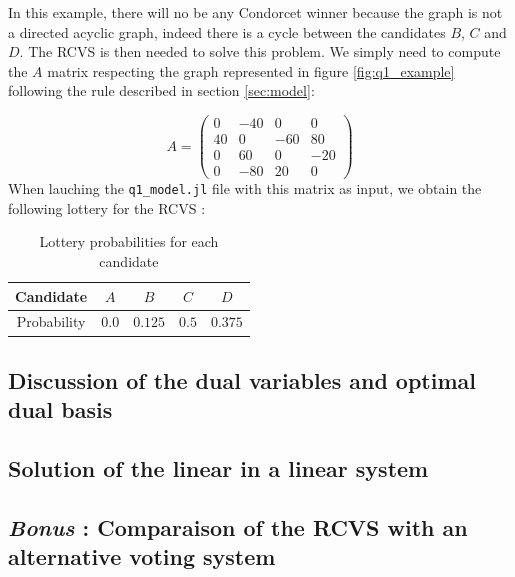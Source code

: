 In this example, there will no be any Condorcet winner because the graph is not a directed acyclic graph, indeed there is a cycle between the candidates $B$, $C$ and $D$.
The RCVS is then needed to solve this problem. We simply need to compute the $A$ matrix respecting the graph represented in figure \ref{fig:q1_example} following the rule described in section \ref{sec:model}:

$$A = \begin{pmatrix}
  0 & -40 & 0 & 0\\
  40 & 0 & -60 & 80\\
  0 & 60 & 0 & -20\\
  0 & -80 & 20 & 0
\end{pmatrix}$$
\newpage
When lauching the \verb|q1_model.jl| file with this matrix as input, we obtain the following lottery for the RCVS :

\begin{table}[!h]
  \centering
  \begin{tabular}{|c|c|c|c|c|}
  \hline
  Candidate   & $A$   & $B$     & $C$   & $D$     \\ \hline
  Probability & $0.0$ & $0.125$ & $0.5$ & $0.375$ \\ \hline
  \end{tabular}
  \caption{Lottery probabilities for each candidate}
  \label{tab:q1_prob}
\end{table}

\subsection{Discussion of the dual variables and optimal dual basis}


\subsection{Solution of the linear in a linear system}


\subsection{\textit{Bonus} : Comparaison of the RCVS with an alternative voting system}
